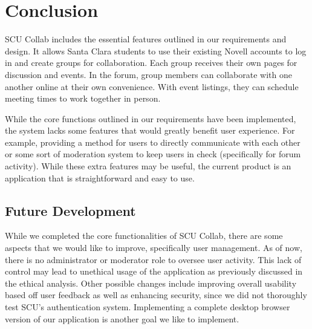 \chapter{Conclusion}
SCU Collab includes the essential features outlined in our requirements and design. It allows Santa Clara students to use their existing Novell accounts to log in and create groups for collaboration. Each group receives their own pages for discussion and events. In the forum, group members can collaborate with one another online at their own convenience. With event listings, they can schedule meeting times to work together in person.

While the core functions outlined in our requirements have been implemented, the system lacks some features that would greatly benefit user experience. For example, providing a method for users to directly communicate with each other or some sort of moderation system to keep users in check (specifically for forum activity). While these extra features may be useful, the current product is  an application that is straightforward and easy to use. 

\section{Future Development}
While we completed the core functionalities of SCU Collab, there are some aspects that we would like to improve, specifically user management. As of now, there is no administrator or moderator role to oversee user activity. This lack of control may lead to unethical usage of the application as previously discussed in the ethical analysis. Other possible changes include improving overall usability based off user feedback as well as enhancing security, since we did not thoroughly test SCU's authentication system. Implementing a complete desktop browser version of our application is another goal we like to implement.